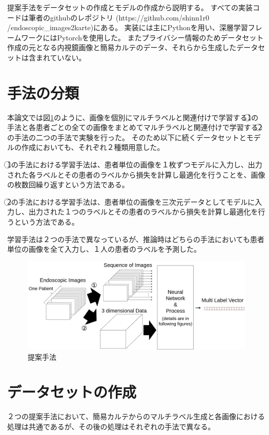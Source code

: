 提案手法をデータセットの作成とモデルの作成から説明する。
すべての実装コードは筆者のgithubのレポジトリ (https://github.com/shinn1r0\\/endoscopic\_images2karte)にある。
実装には主にPythonを用い、深層学習フレームワークにはPytorchを使用した。
またプライバシー情報のためデータセット作成の元となる内視鏡画像と簡易カルテのデータ、それらから生成したデータセットは含まれていない。

\section{手法の分類}
本論文では図\ref{fig:methods}のように、画像を個別にマルチラベルと関連付けで学習する\textcircled{\scriptsize 1}の手法と各患者ごとの全ての画像をまとめてマルチラベルと関連付けで学習する\textcircled{\scriptsize 2}の手法の二つの手法で実験を行った。
そのため以下に続くデータセットとモデルの作成においても、それぞれ２種類用意した。

\textcircled{\scriptsize 1}の手法における学習手法は、患者単位の画像を１枚ずつモデルに入力し、出力された各ラベルとその患者のラベルから損失を計算し最適化を行うことを、画像の枚数回繰り返すという方法である。

\textcircled{\scriptsize 2}の手法における学習手法は、患者単位の画像を三次元データとしてモデルに入力し、出力された１つのラベルとその患者のラベルから損失を計算し最適化を行うという方法である。

学習手法は２つの手法で異なっているが、推論時はどちらの手法においても患者単位の画像を全て入力し、１人の患者のラベルを予測した。
\begin{figure}[htbp]
    \begin{center}
        \includegraphics[width=150mm]{./fig/ieice4.png}
        \caption{提案手法}
        \label{fig:methods}
    \end{center}
\end{figure}

\section{データセットの作成}
２つの提案手法において、簡易カルテからのマルチラベル生成と各画像における処理は共通であるが、その後の処理はそれぞれの手法で異なる。
